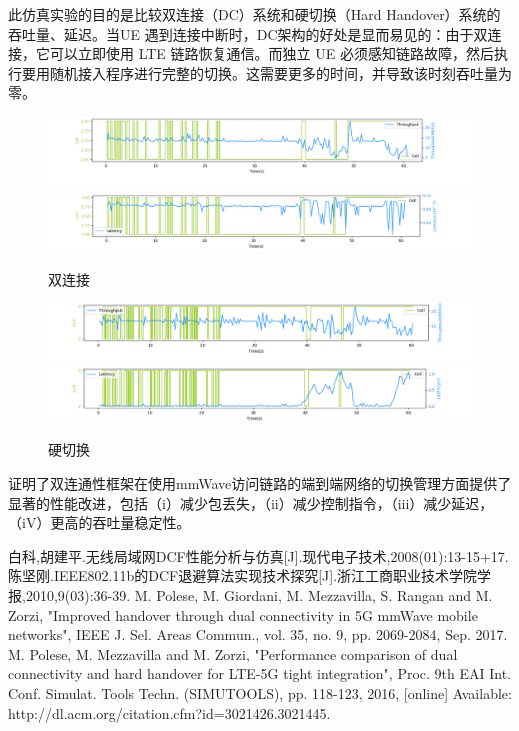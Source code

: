 \documentclass{article}
\begin{document}
此仿真实验的目的是比较双连接（DC）系统和硬切换（Hard Handover）系统的吞吐量、延迟。当UE 遇到连接中断时，DC架构的好处是显而易见的：由于双连接，它可以立即使用 LTE 链路恢复通信。而独立 UE 必须感知链路故障，然后执行要用随机接入程序进行完整的切换。这需要更多的时间，并导致该时刻吞吐量为零。
\begin{figure}[ht]
	\centering
	\includegraphics[scale=0.45]{picture/DlRlcStats_Throughput.png}
	\includegraphics[scale=0.45]{picture/DlRlcStats_Latency.png}
	\caption{双连接}
	\label{fig:delay}
\end{figure}
\begin{figure}[ht]
	\centering
	\includegraphics[scale=0.45]{picture/DlPdcpStats_Throughput.png}
	\includegraphics[scale=0.45]{picture/DlPdcpStats_Latency.png}
	\caption{硬切换}
	\label{fig:delay}
\end{figure}

证明了双连通性框架在使用mmWave访问链路的端到端网络的切换管理方面提供了显著的性能改进，包括（i）减少包丢失，（ii）减少控制指令，（iii）减少延迟，（iV）更高的吞吐量稳定性。
\clearpage
\begin{thebibliography}{99}
	 白科,胡建平.无线局域网DCF性能分析与仿真[J].现代电子技术,2008(01):13-15+17.
	 陈坚刚.IEEE802.11b的DCF退避算法实现技术探究[J].浙江工商职业技术学院学报,2010,9(03):36-39.
	 M. Polese, M. Giordani, M. Mezzavilla, S. Rangan and M. Zorzi, "Improved handover through dual connectivity in 5G mmWave mobile networks", IEEE J. Sel. Areas Commun., vol. 35, no. 9, pp. 2069-2084, Sep. 2017.
	 M. Polese, M. Mezzavilla and M. Zorzi, "Performance comparison of dual connectivity and hard handover for LTE-5G tight integration", Proc. 9th EAI Int. Conf. Simulat. Tools Techn. (SIMUTOOLS), pp. 118-123, 2016, [online] Available: http://dl.acm.org/citation.cfm?id=3021426.3021445.
\end{thebibliography}
\end{document}
